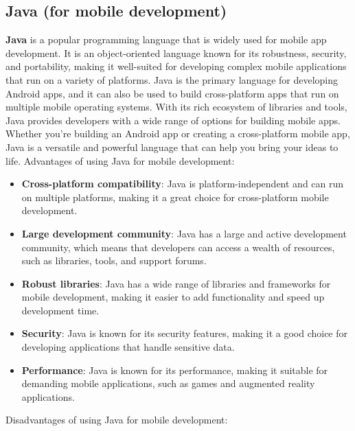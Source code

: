 \subsection{Java (for mobile development)}
\textbf{Java} is a popular programming language that is widely used for mobile app development. It is an object-oriented language known for its robustness, security, and portability, making it well-suited for developing complex mobile applications that run on a variety of platforms. Java is the primary language for developing Android apps, and it can also be used to build cross-platform apps that run on multiple mobile operating systems. With its rich ecosystem of libraries and tools, Java provides developers with a wide range of options for building mobile apps. Whether you're building an Android app or creating a cross-platform mobile app, Java is a versatile and powerful language that can help you bring your ideas to life.
Advantages of using Java for mobile development:
\begin{itemize}
    \item \textbf{Cross-platform compatibility}: Java is platform-independent and can run on multiple platforms, making it a great choice for cross-platform mobile development.

    \item \textbf{Large development community}: Java has a large and active development community, which means that developers can access a wealth of resources, such as libraries, tools, and support forums.

    \item \textbf{Robust libraries}: Java has a wide range of libraries and frameworks for mobile development, making it easier to add functionality and speed up development time.

    \item \textbf{Security}: Java is known for its security features, making it a good choice for developing applications that handle sensitive data.

    \item \textbf{Performance}: Java is known for its performance, making it suitable for demanding mobile applications, such as games and augmented reality applications.
\end{itemize}
Disadvantages of using Java for mobile development:
